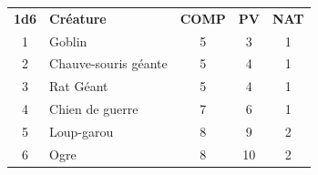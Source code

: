 \begin{frame}[b]
{\begin{minipage}[c][0.95\textheight][c]{\linewidth}
\begin{center}
\begin{tabular}{clccc}
\textbf{1d6} &  \textbf{Créature} &  \textbf{COMP} &  \textbf{PV} &  \textbf{NAT} \\
    1 &  Goblin               &       5 &     3 &      1 \\
    2 &  Chauve-souris géante &       5 &     4 &      1 \\
    3 &  Rat Géant            &       5 &     4 &      1 \\
    4 &  Chien de guerre      &       7 &     6 &      1 \\
    5 &  Loup-garou           &       8 &     9 &      2 \\
    6 &  Ogre                 &       8 &    10 &      2 \\
\end{tabular}
\end{center}

\end{minipage}
}
\end{frame}


